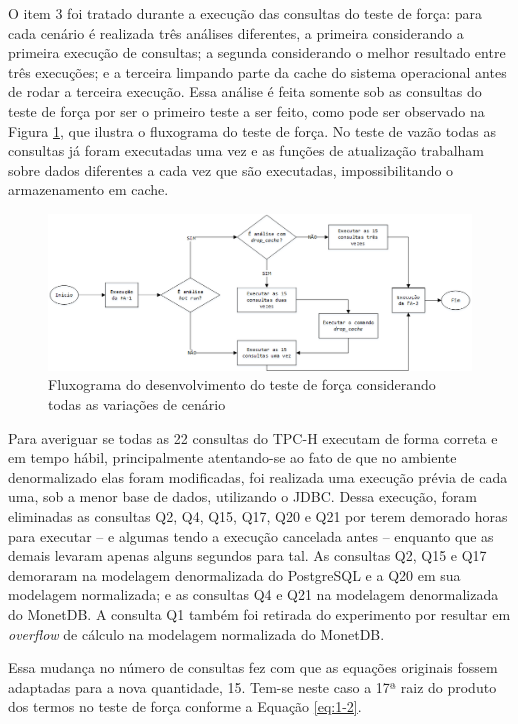 O item 3 foi tratado durante a execução das consultas do teste de força: para cada cenário é realizada três 
análises diferentes, a primeira considerando a primeira execução de consultas; a segunda considerando o melhor 
resultado entre três execuções; e a terceira limpando parte da cache do sistema operacional antes de 
rodar a terceira execução. Essa análise é feita somente sob as consultas do teste de força por ser o primeiro 
teste a ser feito, como pode ser observado na Figura \ref{fig:power_flux}, que ilustra o fluxograma do teste de força. No teste de vazão todas as consultas já foram executadas 
uma vez e as funções de atualização trabalham sobre dados diferentes a cada vez que são executadas, impossibilitando 
o armazenamento em cache.

\begin{figure}[htpb]
	\centering
        \includegraphics[width=\textwidth]{power_flux}
	\caption{Fluxograma do desenvolvimento do teste de força considerando todas as variações de cenário}
	\label{fig:power_flux}
\end{figure}

Para averiguar se todas as 22 consultas do TPC-H executam de forma correta e em tempo hábil, principalmente 
atentando-se ao fato de que no ambiente denormalizado elas foram modificadas, foi realizada uma execução 
prévia de cada uma, sob a menor base de dados, utilizando o JDBC. Dessa execução, foram eliminadas as consultas 
Q2, Q4, Q15, Q17, Q20 e Q21 por terem demorado horas para executar -- e algumas tendo a execução 
cancelada antes -- enquanto que as demais levaram apenas alguns segundos para tal. As consultas Q2, Q15 e Q17 demoraram 
na modelagem denormalizada do PostgreSQL e a Q20 em sua modelagem normalizada; e as consultas Q4 e Q21 na modelagem denormalizada do MonetDB. A consulta 
Q1 também foi retirada do experimento por resultar em \textit{overflow} de cálculo na modelagem normalizada do MonetDB.

Essa mudança no número 
de consultas fez com que as equações originais fossem adaptadas para a nova quantidade, 15. Tem-se neste caso a 17ª raiz do produto dos termos no teste de força conforme a Equação \ref{eq:1-2}.

